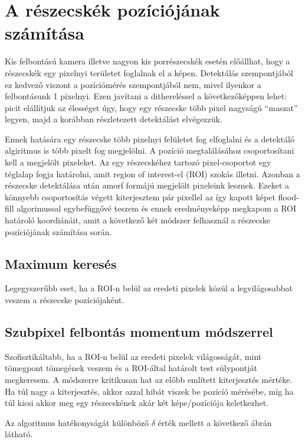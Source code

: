 \section{A részecskék pozíciójának számítása}
	Kis felbontású kamera illetve nagyon kis porrészecskék esetén előállhat, hogy a részecskék egy
	pixelnyi területet foglalnak el a képen. Detektálás szempontjából ez kedvező viszont a pozíciómérés
	szempontjából nem, mivel ilyenkor a felbontásunk 1 pixelnyi. Ezen javítani a dithereléssel a
	következőképpen lehet: picit elállítjuk az élességet úgy, hogy egy részecske több pixel nagyságú
	``maszat'' legyen, majd a korábban részletezett detektálást elvégezzük.
	
	Ennek hatására egy részecske több pixelnyi felületet fog elfoglalni és a detektáló algiritmus is
	több pixelt fog megjelölni. A pozíció megtalálásához csoportosítani kell a megjelölt pixeleket.
	Az egy részecskéhez tartozó pixel-csoportot egy téglalap fogja határolni, amit region of
	interest-el (ROI) szokás illetni. Azonban a részecske detektálása után amorf formájú megjelölt
	pixeleink lesznek. Ezeket a könnyebb csoportosítás végett kiterjesztem pár pixellel az így kapott
	képet flood-fill algorimussal egybefüggővé teszem és ennek eredményeképp megkapom a ROI határoló
	koordiánáit, amit a következő két módszer felhasznál a részecske pozíciójának számítása során.
	\subsection*{Maximum keresés}
	Legegyszerűbb eset, ha a ROI-n belül az eredeti pixelek közül a legvilágosabbat veszem a
	részecske pozíciójaként.
	\subsection*{Szubpixel felbontás momentum módszerrel}
	Szofisztikáltabb, ha a ROI-n belül az eredeti pixelek világosságát, mint tömegpont tömegének veszem
	és a ROI-által határolt test súlypontját megkeresem. A módszerre kritikusan hat az előbb említett
	kiterjesztés mértéke. Ha túl nagy a kiterjesztés, akkor azzal hibát viszek be pozicíó mérésébe,
	míg ha túl kicsi akkor meg egy részecskének akár két képe/pozíciója keletkezhet.
	
	\noindent Az algoritmus hatékonyságát különböző $\delta$ érték mellett a következő 
	ábrán látható.
	
